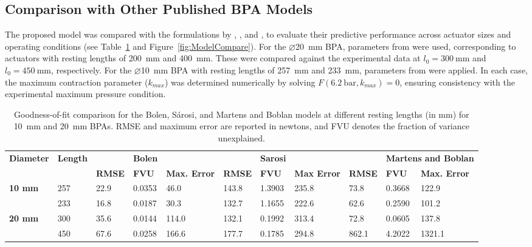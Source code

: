 \subsection{Comparison with Other Published BPA Models}

The proposed model was compared with the formulations by \citet{sarosi_new_2012}, \citet{sarosi_10mm}, and \citet{martens_modeling_2017}, to evaluate their predictive performance across actuator sizes and operating conditions (see Table~\ref{tab:model_compare} and Figure~\ref{fig:ModelCompare}).
For the $\diameter$\qty{20}{\mm} BPA, parameters from \cite{sarosi_new_2012} were used, corresponding to actuators with resting lengths of \qty{200}{\mm} and \qty{400}{\mm}. These were compared against the experimental data at $l_0=\qty{300}{\mm}$ and $l_0=\qty{450}{\mm}$, respectively. For the $\diameter$\qty{10}{\mm} BPA with resting lengths of \qty{257}{\mm} and \qty{233}{\mm}, parameters from \cite{sarosi_10mm} were applied. In each case, the maximum contraction parameter ($k_{max}$) was determined numerically by solving $F(\qty{6.2}{\bar}, k_{max}) = 0$, ensuring consistency with the experimental maximum pressure condition.




\begin{table}[H]
\caption{Goodness-of-fit comparison for the Bolen, Sárosi, and Martens and Boblan models at different resting lengths (in mm) for \qty{10}{\mm} and \qty{20}{\mm} BPAs. RMSE and maximum error are reported in newtons, and FVU denotes the fraction of variance unexplained.}
\label{tab:model_compare}
\tiny
\begin{adjustwidth}{-2cm}{0cm}
\begin{tabularx}{\textwidth}{@{}lllllllllll@{}}
\toprule
\textbf{Diameter} &
  \textbf{Length} &
  \textbf{} &
  \textbf{Bolen} &
  \textbf{} &
  \textbf{} &
  \textbf{Sarosi} &
  \textbf{} &
  \textbf{} &
  \multicolumn{2}{l}{\textbf{Martens and Boblan}} \\ 
\textbf{} &
  \textbf{} &
  \textbf{RMSE} &
  \textbf{FVU} &
  \textbf{Max. Error} &
  \textbf{RMSE} &
  \textbf{FVU} &
  \textbf{Max Error} &
  \textbf{RMSE} &
  \textbf{FVU} &
  \textbf{Max. Error} \\ \midrule
\textbf{10 mm} & 257 & 22.9 & 0.0353 & 46.0  & 143.8 & 1.3903 & 235.8 & 73.8  & 0.3668 & 122.9  \\
\textbf{}      & 233 & 16.8 & 0.0187 & 30.3  & 132.7 & 1.1655 & 222.6 & 62.6  & 0.2590 & 101.2  \\ \midrule
\textbf{20 mm} & 300 & 35.6 & 0.0144 & 114.0 & 132.1 & 0.1992 & 313.4 & 72.8  & 0.0605 & 137.8  \\
\textbf{}      & 450 & 67.6 & 0.0258 & 166.6 & 177.7 & 0.1785 & 294.8 & 862.1 & 4.2022 & 1321.1 \\ \bottomrule
\end{tabularx}
\end{adjustwidth}
\end{table}

